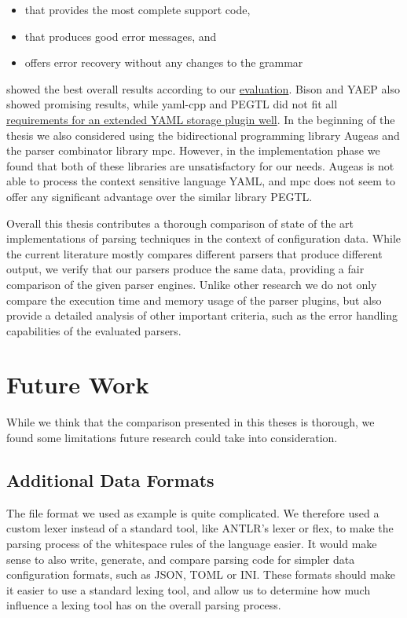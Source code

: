 \begin{itemize}
  \item that provides the most complete support code,
  \item that produces good error messages, and
  \item offers error recovery without any changes to the grammar
\end{itemize}

showed the best overall results according to our \hyperref[sec:evaluation]{evaluation}. Bison and \gls{YAEP} also showed promising results, while yaml-cpp and PEGTL did not fit all \hyperref[sec:requirements_extended_yaml_plugin]{requirements for an extended YAML storage plugin well}. In the beginning of the thesis we also considered using the bidirectional programming library Augeas and the parser combinator library mpc. However, in the implementation phase we found that both of these libraries are unsatisfactory for our needs. Augeas is not able to process the context sensitive language YAML, and mpc does not seem to offer any significant advantage over the similar library \gls{PEGTL}.

Overall this thesis contributes a thorough comparison of state of the art implementations of parsing techniques in the context of configuration data. While the current literature mostly compares different parsers that produce different output, we verify that our parsers produce the same data, providing a fair comparison of the given parser engines. Unlike other research we do not only compare the execution time and memory usage of the parser plugins, but also provide a detailed analysis of other important criteria, such as the error handling capabilities of the evaluated parsers.

\section{Future Work}

While we think that the comparison presented in this theses is thorough, we found some limitations future research could take into consideration.

\subsection{Additional Data Formats}

The  file format we used as example is quite complicated. We therefore used a custom lexer instead of a standard tool, like ANTLR’s lexer or flex, to make the parsing process of the whitespace rules of the language easier. It would make sense to also write, generate, and compare parsing code for simpler data configuration formats, such as \gls{JSON}, TOML or INI. These formats should make it easier to use a standard lexing tool, and allow us to determine how much influence a lexing tool has on the overall parsing process.

